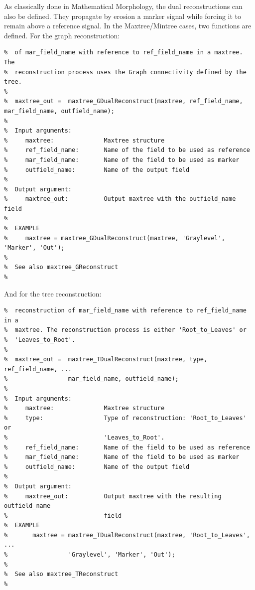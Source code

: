 \documentclass[DIV=calc, paper=a4, fontsize=11pt]{scrartcl}	 %
\begin{document}
As classically done in Mathematical Morphology, the dual reconstructions can also be defined. They propagate by erosion a marker signal while forcing it to remain above a reference signal. In the Maxtree/Mintree cases, two functions are defined. For the graph reconstruction:
\begin{lstlisting}[aboveskip=0.5 \baselineskip]
%  maxtree_GDualReconstruct computes the dual morphological reconstruction
%  of mar_field_name with reference to ref_field_name in a maxtree. The
%  reconstruction process uses the Graph connectivity defined by the tree.
%
%  maxtree_out =  maxtree_GDualReconstruct(maxtree, ref_field_name, mar_field_name, outfield_name);
% 
%  Input arguments:
%     maxtree:              Maxtree structure
%     ref_field_name:       Name of the field to be used as reference 
%     mar_field_name:       Name of the field to be used as marker 
%     outfield_name:        Name of the output field  
%
%  Output argument:
%     maxtree_out:          Output maxtree with the outfield_name field
%
%  EXAMPLE 
%     maxtree = maxtree_GDualReconstruct(maxtree, 'Graylevel', 'Marker', 'Out');
%
%  See also maxtree_GReconstruct
%
\end{lstlisting}
And for the tree reconstruction: 
\begin{lstlisting}[aboveskip=0.5 \baselineskip]
%  maxtree_TDualReconstruct computes the dual morphological Tree
%  reconstruction of mar_field_name with reference to ref_field_name in a
%  maxtree. The reconstruction process is either 'Root_to_Leaves' or
%  'Leaves_to_Root'. 
%
%  maxtree_out =  maxtree_TDualReconstruct(maxtree, type, ref_field_name, ...
%                 mar_field_name, outfield_name);
%
%  Input arguments:
%     maxtree:              Maxtree structure
%     type:                 Type of reconstruction: 'Root_to_Leaves' or 
%                           'Leaves_to_Root'.
%     ref_field_name:       Name of the field to be used as reference 
%     mar_field_name:       Name of the field to be used as marker 
%     outfield_name:        Name of the output field  
%
%  Output argument:
%     maxtree_out:          Output maxtree with the resulting outfield_name
%                           field
%  EXAMPLE 
%       maxtree = maxtree_TDualReconstruct(maxtree, 'Root_to_Leaves', ...
%                 'Graylevel', 'Marker', 'Out');
%
%  See also maxtree_TReconstruct
%
\end{lstlisting}
\end{document}
